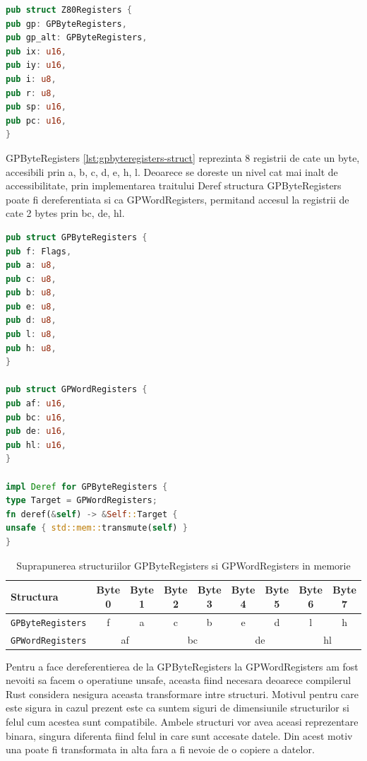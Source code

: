 \documentclass[titlepage,12pt]{article}
\DeclareRobustCommand{\code}[1]{{\ttfamily\small #1}}
\begin{document}
\begin{lstlisting}[language=Rust,caption={Structura Z80Registers},label={lst:z80registers-struct}]
pub struct Z80Registers {
pub gp: GPByteRegisters,
pub gp_alt: GPByteRegisters,
pub ix: u16,
pub iy: u16,
pub i: u8,
pub r: u8,
pub sp: u16,
pub pc: u16,
}
\end{lstlisting}

\code{GPByteRegisters} \cref{lst:gpbyteregisters-struct} reprezinta 8 registrii de cate un byte, accesibili prin \code{a}, \code{b}, \code{c}, \code{d}, \code{e}, \code{h}, \code{l}.
Deoarece se doreste un nivel cat mai inalt de accessibilitate, prin implementarea traitului \code{Deref} structura \code{GPByteRegisters} poate fi dereferentiata si ca \code{GPWordRegisters}, permitand accesul la registrii de cate 2 bytes prin \code{bc}, \code{de}, \code{hl}.

\begin{lstlisting}[language=Rust,caption={Structura GPByteRegisters},label={lst:gpbyteregisters-struct}]
pub struct GPByteRegisters {
pub f: Flags,
pub a: u8,
pub c: u8,
pub b: u8,
pub e: u8,
pub d: u8,
pub l: u8,
pub h: u8,
}

pub struct GPWordRegisters {
pub af: u16,
pub bc: u16,
pub de: u16,
pub hl: u16,
}

impl Deref for GPByteRegisters {
type Target = GPWordRegisters;
fn deref(&self) -> &Self::Target {
unsafe { std::mem::transmute(self) }
}
\end{lstlisting}

\begin{table}[h!]
\centering
\begin{tabular}{|l|c|c|c|c|c|c|c|c|}
\hline
\textbf{Structura} & \textbf{Byte 0} & \textbf{Byte 1} & \textbf{Byte 2} & \textbf{Byte 3} & \textbf{Byte 4} & \textbf{Byte 5} & \textbf{Byte 6} & \textbf{Byte 7} \\
\hline
\texttt{GPByteRegisters} & f & a & c & b & e & d & l & h \\
\hline
\texttt{GPWordRegisters} & \multicolumn{2}{c|}{af} & \multicolumn{2}{c|}{bc} & \multicolumn{2}{c|}{de} & \multicolumn{2}{c|}{hl} \\
\hline
\end{tabular}
\caption{Suprapunerea structuriilor \code{GPByteRegisters} si \code{GPWordRegisters} in memorie}
\end{table}

Pentru a face dereferentierea de la \code{GPByteRegisters} la \code{GPWordRegisters} am fost nevoiti sa facem o operatiune unsafe, aceasta fiind necesara deoarece compilerul Rust considera nesigura aceasta transformare intre structuri. Motivul pentru care este sigura in cazul prezent este ca suntem siguri de dimensiunile structurilor si felul cum acestea sunt compatibile.
Ambele structuri vor avea aceasi reprezentare binara, singura diferenta fiind felul in care sunt accesate datele. Din acest motiv una poate fi transformata in alta fara a fi nevoie de o copiere a datelor.
\end{document}
